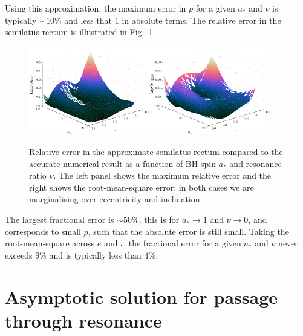 \documentclass[aps,prd,amsfonts,amssymb,amsmath,nofootinbib,showpacs,superscriptaddress,twocolumn,floatfix]{revtex4-1}
\newcommand{\figref}[1]{Fig.~\ref{fig:#1}}
\begin{document}
Using this approximation, the maximum error in $p$ for a given $a_\ast$ and $\nu$ is typically $\sim10\%$ and less that $1$ in absolute terms. The relative error in the semilatus rectum is illustrated in \figref{p-error}. 
\begin{figure}[htp]
\centering
\centerline{\includegraphics[width=0.47\textwidth]{Fig_fit-error-max-plane}\quad\includegraphics[width=0.47\textwidth]{Fig_fit-error-RMS-plane}}
\caption{\label{fig:p-error}Relative error in the approximate semilatus rectum compared to the accurate numerical result as a function of BH spin $a_\ast$ and resonance ratio $\nu$. The left panel shows the maximum relative error and the right shows the root-mean-square error; in both cases we are marginalising over eccentricity and inclination.}
\end{figure}
The largest fractional error is $\sim50\%$, this is for $a_\ast \rightarrow 1$ and $\nu \rightarrow 0$, and corresponds to small $p$, such that the absolute error is still small. Taking the root-mean-square across $e$ and $\iota$, the fractional error for a given $a_\ast$ and $\nu$ never exceeds $9\%$ and is typically less than $4\%$.

\section{Asymptotic solution for passage through resonance}\label{sec:res-asymptotic}
\end{document}
